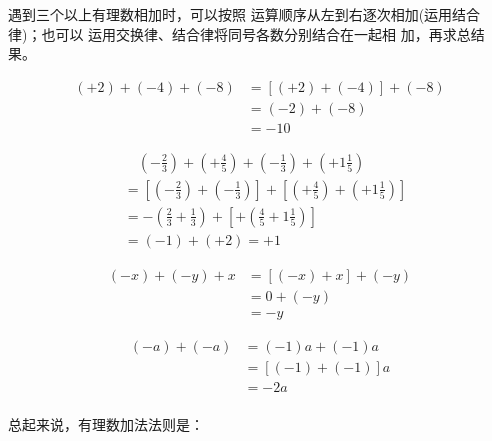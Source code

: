 \begin{analyze}
	遇到三个以上有理数相加时，可以按照
	运算顺序从左到右逐次相加(运用结合律)；也可以
	运用交换律、结合律将同号各数分别结合在一起相
	加，再求总结果。
\end{analyze}


\begin{solution}
	\begin{align*}
	(+2)+(-4)+(-8)&= [(+2)+(-4)]+(-8) \tag{结合律}\\
	&=(-2)+(-8) \tag{异号相加法则}\\
	&=-10 \tag{同号相加法则}
	\end{align*}
	
	\begin{align*}
	&\quad   \left(-\frac{2}{3}\right)+\left(+\frac{4}{5}\right)+\left(-\frac{1}{3}\right)+\left(+1\frac{1}{5}\right)\\
	&=\left[\left(-\frac{2}{3}\right)+\left(-\frac{1}{3}\right)\right]+\left[\left(+\frac{4}{5}\right)+\left(+1\frac{1}{5}\right)\right]  \tag{交换、结合律}\\
	&=-\left(\frac{2}{3}+\frac{1}{3}\right)+\left[+\left(\frac{4}{5}+1\frac{1}{5}\right)\right]  \tag{同号加法法则}\\
	&=(-1)+(+2)=+1  \tag{异号加法法则}
	\end{align*}
	
	\begin{align*}
	(-x)+(-y)+x  &= [(-x)+x]+(-y)  \tag{交换、结合律}\\
	&=0+(-y) \tag{相反数的性质}\\
	&=-y \tag{零的特性}
	\end{align*}
	
	\begin{align*}
	(-a)+(-a) &= (-1)a+(-1)a  \tag{相反数的意义}\\
	&=[(-1)+(-1)]a  \tag{分配律}\\
	&=-2a  \tag{同号加法法则}\\
	\end{align*}
\end{solution}

总起来说，有理数加法法则是：

